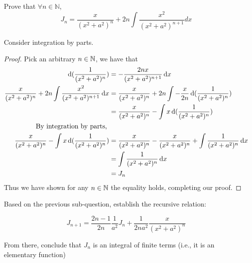 \documentclass{alittlebear}
\begin{document}
\begin{exercise}{}{}
    \begin{question}{}{}
        Prove that $\forall n \in \mathbb{N}$, $$
        J_{n}=\frac{x}{\left(x^{2}+a^{2}\right)^{n}}+2 n \int \frac{x^{2}}{\left(x^{2}+a^{2}\right)^{n+1}} d x
        $$

        \begin{hint}
            Consider integration by parts.
        \end{hint}

        \begin{proof}{}{}
            Pick an arbitrary $n\in\mathbb{N}$, we have that
            \begin{align*}
            \D (\frac{1}{(x^2+a^2)^{n}}) &= -\frac{2nx}{(x^2+a^2)^{n+1}}\D x\\
                \frac{x}{(x^2+a^2)^{n}}+2n\int \frac{x^2}{(x^2+a^2)^{n+1}}\D x &= \frac{x}{(x^2+a^2)^{n}}+2n\int -\frac{x}{2n}\D (\frac{1}{(x^2+a^2)^{n}})\\
                &=\frac{x}{(x^2+a^2)^{n}}-\int x\D (\frac{1}{(x^2+a^2)^{n}})\\
                \text{By integration by parts, }\\
                \frac{x}{(x^2+a^2)^{n}}-\int x\D (\frac{1}{(x^2+a^2)^{n}}) &= \frac{x}{(x^2+a^2)^{n}} - \frac{x}{(x^2+a^2)^{n}} + \int \frac{1}{(x^2+a^2)^{n}}\D x\\
                &= \int \frac{1}{(x^2+a^2)^{n}}\D x\\
                &= J_n
            \end{align*}
            Thus we have shown for any $n\in\mathbb{N}$ the equality holds, completing our proof.
        \end{proof}
    \end{question}

    \begin{question}{}{}
        Based on the previous sub-question, establish the recursive relation:

        $$
        J_{n+1}=\frac{2 n-1}{2 n} \frac{1}{a^{2}} J_{n}+\frac{1}{2 n a^{2}} \frac{x}{\left(x^{2}+a^{2}\right)^{n}}
        $$

        From there, conclude that $J_{n}$ is an integral of finite terms (i.e., it is an elementary function) 

        \tcblower


\end{question}
\end{exercise}
\end{document}
